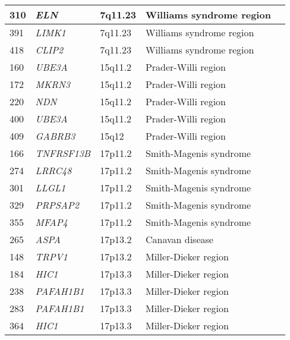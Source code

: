 \begin{table}[]
\begin{tabular}{ | l | l | l | l | l | }
310          & \textit{ELN}           & 7q11.23              & Williams syndrome region \\* \midrule
391          & \textit{LIMK1}         & 7q11.23              & Williams syndrome region \\* \midrule
418          & \textit{CLIP2}         & 7q11.23              & Williams syndrome region \\* \midrule
160          & \textit{UBE3A}         & 15q11.2              & Prader-Willi region      \\* \midrule
172          & \textit{MKRN3}         & 15q11.2              & Prader-Willi region      \\* \midrule
220          & \textit{NDN}           & 15q11.2              & Prader-Willi region      \\* \midrule
400          & \textit{UBE3A}         & 15q11.2              & Prader-Willi region      \\* \midrule
409          & \textit{GABRB3}        & 15q12                & Prader-Willi region      \\* \midrule
166          & \textit{TNFRSF13B}     & 17p11.2              & Smith-Magenis syndrome   \\* \midrule
274          & \textit{LRRC48}        & 17p11.2              & Smith-Magenis syndrome   \\* \midrule
301          & \textit{LLGL1}         & 17p11.2              & Smith-Magenis syndrome   \\* \midrule
329          & \textit{PRPSAP2}       & 17p11.2              & Smith-Magenis syndrome   \\* \midrule
355          & \textit{MFAP4}         & 17p11.2              & Smith-Magenis syndrome   \\* \midrule
265          & \textit{ASPA}          & 17p13.2              & Canavan disease          \\* \midrule
148          & \textit{TRPV1}         & 17p13.2              & Miller-Dieker region     \\* \midrule
184          & \textit{HIC1}          & 17p13.3              & Miller-Dieker region     \\* \midrule
238          & \textit{PAFAH1B1}      & 17p13.3              & Miller-Dieker region     \\* \midrule
283          & \textit{PAFAH1B1}      & 17p13.3              & Miller-Dieker region     \\* \midrule
364          & \textit{HIC1}          & 17p13.3              & Miller-Dieker region     \\* \midrule

\end{tabular}
\end{table}
